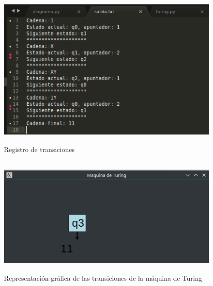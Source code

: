 \begin{figure}[H]
\begin{center}
 \includegraphics[width=13cm, height=8cm]{./img/uno_historial.png}
 \caption{Registro de transiciones}
 \label{fig:uno_historial}
\end{center}
\end{figure}

\begin{figure}[H]
\begin{center}
 \includegraphics[width=13cm, height=6cm]{./img/uno_grafica.png}
 \caption{Representación gráfica de las transiciones de la máquina de Turing}
 \label{fig:uno_grafica}
\end{center}
\end{figure}

